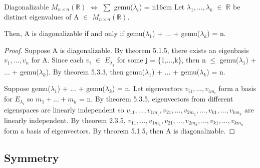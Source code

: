     \newpage



    \begin{corollary}{Diagonalizable $M_{n \times n}(\mathbb{R})$
    $\Leftrightarrow$ $\sum$ gemu($\lambda_i$) = n}{16cm}
        Let $\lambda_1,...,\lambda_k$ $\in$ $\mathbb{R}$ be distinct
        eigenvalues of A $\in$ $M_{n \times n}(\mathbb{R})$.

        Then, A is diagonalizable if and only if
        gemu($\lambda_1$) + ... + gemu($\lambda_k$) = n.
    \end{corollary}

    \begin{proof}
        Suppose A is diagonalizable.
        By {\color{red} theorem 5.1.5}, there exists an eigenbasis
        $v_1,...,v_n$ for A.
        Since each $v_i$ $\in$ $E_{\lambda_j}$ for some j = \{1,...,k\}, then
        n $\leq$ gemu($\lambda_1$) + ... + gemu($\lambda_k$).
        By {\color{red} theorem 5.3.3}, then
        gemu($\lambda_1$) + ... + gemu($\lambda_k$) = n.

        \vspace{0.3cm}

        Suppose gemu($\lambda_1$) + ... + gemu($\lambda_k$) = n.
        Let eigenvectors $v_{i1},...,v_{im_i}$ form a basis for $E_{\lambda_i}$
        so $m_1 + ... + m_k$ = n.
        By {\color{red} theorem 5.3.5}, eigenvectors from different
        eigenspaces are linearly independent so
        $v_{11},...,v_{1m_1},v_{21},...,v_{2m_2},...,v_{k1},...,v_{km_k}$
        are linearly independent.
        By {\color{red} theorem 2.3.5},
        $v_{11},...,v_{1m_1},v_{21},...,v_{2m_2},...,v_{k1},...,v_{km_k}$
        form a basis of eigenvectors.
        By {\color{red} theorem 5.1.5}, then A is diagonalizable.
    \end{proof}

    \vspace{0.5cm}



    

\subsection{ Symmetry }

